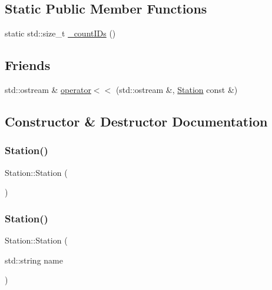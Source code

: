 \subsection*{Static Public Member Functions}
\begin{DoxyCompactItemize}
\item 
static std\+::size\+\_\+t \mbox{\hyperlink{class_station_a0507e4875711fa10696ab05ec8cbc215}{\+\_\+count\+I\+Ds}} ()
\end{DoxyCompactItemize}
\subsection*{Friends}
\begin{DoxyCompactItemize}
\item 
std\+::ostream \& \mbox{\hyperlink{class_station_a98b2219804f7e593b080d3c8dec80f0b}{operator$<$$<$}} (std\+::ostream \&, \mbox{\hyperlink{class_station}{Station}} const \&)
\end{DoxyCompactItemize}


\subsection{Constructor \& Destructor Documentation}
\mbox{\label{class_station_a73d335726aad1d844d81cda6d9fd74e6}} 
\subsubsection{\texorpdfstring{Station()}{Station()}\hspace{0.1cm}{\footnotesize\ttfamily [1/4]}}
{\footnotesize\ttfamily Station\+::\+Station (\begin{DoxyParamCaption}{ }\end{DoxyParamCaption})}

\mbox{\label{class_station_aeeba2cddaa328abff85cebfa5898b988}} 
\subsubsection{\texorpdfstring{Station()}{Station()}\hspace{0.1cm}{\footnotesize\ttfamily [2/4]}}
{\footnotesize\ttfamily Station\+::\+Station (\begin{DoxyParamCaption}\item[{std\+::string}]{name }\end{DoxyParamCaption})}

